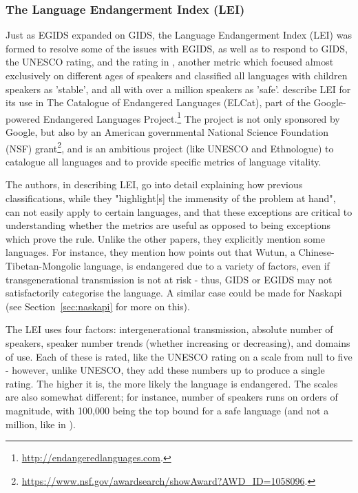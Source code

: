 \subsubsection{The Language Endangerment Index (LEI)}

Just as EGIDS expanded on GIDS, the Language Endangerment Index (LEI) was formed to resolve some of the issues with EGIDS, as well as to respond to GIDS, the UNESCO rating, and the rating in \citet{krauss2007classification}, another metric which focused almost exclusively on different ages of speakers and classified all languages with children speakers as 'stable', and all with over a million speakers as 'safe'. \citet{lee2016assessing} describe LEI for its use in The Catalogue of Endangered Languages (ELCat), part of the Google-powered Endangered Languages Project.\footnote{\href{http://endangeredlanguages.com}{http://endangeredlanguages.com}. } The project is not only sponsored by Google, but also by an American governmental National Science Foundation (NSF) grant\footnote{\href{https://www.nsf.gov/awardsearch/showAward?AWD\_ID=1058096}{https://www.nsf.gov/awardsearch/showAward?AWD\_ID=1058096}. }, and is an ambitious project (like UNESCO and Ethnologue) to catalogue all languages and to provide specific metrics of language vitality.

The authors, in describing LEI, go into detail explaining how previous classifications, while they "highlight[s] the immensity of the problem at hand", can not easily apply to certain languages, and that these exceptions are critical to understanding whether the metrics are useful as opposed to being exceptions which prove the rule. Unlike the other papers, they explicitly mention some languages. For instance, they mention how \citet{dwyer2012tools} points out that Wutun, a Chinese-Tibetan-Mongolic language, is endangered due to a variety of factors, even if transgenerational transmission is not at risk - thus, GIDS or EGIDS may not satisfactorily categorise the language. A similar case could be made for Naskapi (see Section~\ref{sec:naskapi} for more on this).

The LEI uses four factors: intergenerational transmission, absolute number of speakers, speaker number trends (whether increasing or decreasing), and domains of use. Each of these is rated, like the UNESCO rating on a scale from null to five - however, unlike UNESCO, they add these numbers up to produce a single rating. The higher it is, the more likely the language is endangered. The scales are also somewhat different; for instance, number of speakers runs on orders of magnitude, with 100,000 being the top bound for a safe language (and not a million, like in \citet{krauss2007classification}).


